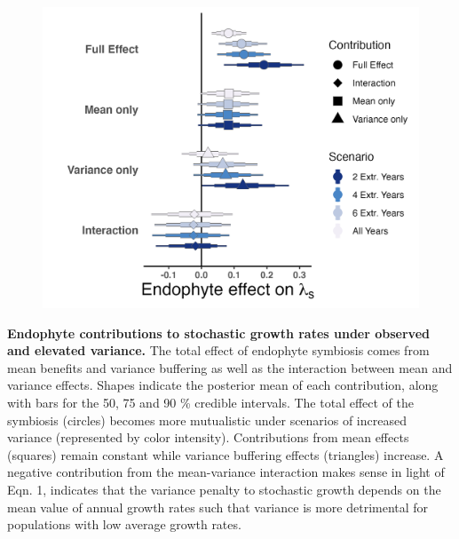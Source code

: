 \documentclass[12pt]{article}
\begin{document}
\begin{figure}
	\centering
	\includegraphics[width=.8\linewidth]{StochDemo_fig3.png}
\end{figure}
 \textbf{Endophyte contributions to stochastic growth rates under observed and elevated variance.} The total effect of endophyte symbiosis comes from mean benefits and variance buffering as well as the interaction between mean and variance effects. Shapes indicate the posterior mean of each contribution, along with bars for the 50, 75 and 90 \% credible intervals.  The total effect of the symbiosis (circles) becomes more mutualistic under scenarios of increased variance (represented by color intensity). Contributions from mean effects (squares) remain constant while variance buffering effects (triangles) increase. A negative contribution from the mean-variance interaction makes sense in light of Eqn. 1, indicates that the variance penalty to stochastic growth depends on the mean value of annual growth rates such that variance is more detrimental for populations with low average growth rates.
\newpage
\end{document}

